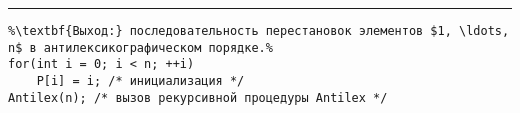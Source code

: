 \documentclass{article}
\begin{document}
\vspace{5pt} \hrule
\begin{lstlisting}[caption={Генерация перестановок в антилексикографическом порядке}, label=p186_2, escapechar=\%]
%\noindent\textbf{Вход:} n - количество элементов.\\%
%\textbf{Выход:} последовательность перестановок элементов $1, \ldots, n$ в антилексикографическом порядке.%
for(int i = 0; i < n; ++i)
	P[i] = i; /* инициализация */
Antilex(n); /* вызов рекурсивной процедуры Antilex */
\end{lstlisting}
\end{document}
